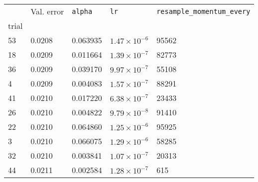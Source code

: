 \begin{tabular}{lp{2.3cm}p{2.3cm}p{2.3cm}p{2.3cm}}
\toprule
{} &  Val. error &  \texttt{alpha} &         \texttt{lr} &  \texttt{resample\_momentum\_every} \\
trial &             &                 &                     &                                     \\
\midrule
53    &      0.0208 &        0.063935 & $1.47\times10^{-6}$ &                               95562 \\
18    &      0.0209 &        0.011664 & $1.39\times10^{-7}$ &                               82773 \\
36    &      0.0209 &        0.039170 & $9.97\times10^{-7}$ &                               55108 \\
4     &      0.0209 &        0.004083 & $1.57\times10^{-7}$ &                               88291 \\
41    &      0.0210 &        0.017220 & $6.38\times10^{-7}$ &                               23433 \\
26    &      0.0210 &        0.004822 & $9.79\times10^{-8}$ &                               91410 \\
22    &      0.0210 &        0.064860 & $1.25\times10^{-6}$ &                               95925 \\
3     &      0.0210 &        0.066075 & $1.29\times10^{-6}$ &                               58285 \\
32    &      0.0210 &        0.003841 & $1.07\times10^{-7}$ &                               20313 \\
44    &      0.0211 &        0.002584 & $1.28\times10^{-7}$ &                                 615 \\
\bottomrule
\end{tabular}
